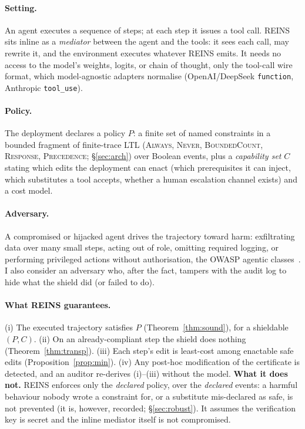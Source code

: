 \documentclass[11pt]{article}
\begin{document}
\paragraph{Setting.} An agent executes a sequence of steps; at each step it issues
a tool call. REINS sits inline as a \emph{mediator} between the agent and the
tools: it sees each call, may rewrite it, and the environment executes whatever
REINS emits. It needs no access to the model's weights, logits, or chain of
thought, only the tool-call wire format, which model-agnostic adapters normalise
(OpenAI/DeepSeek \texttt{function}, Anthropic \texttt{tool\_use}).

\paragraph{Policy.} The deployment declares a policy $P$: a finite set of named
constraints in a bounded fragment of finite-trace LTL
(\textsc{Always}, \textsc{Never}, \textsc{BoundedCount}, \textsc{Response},
\textsc{Precedence}; \S\ref{sec:arch}) over Boolean events, plus a
\emph{capability set} $C$ stating which edits the deployment can enact (which
prerequisites it can inject, which substitutes a tool accepts, whether a human
escalation channel exists) and a cost model.

\paragraph{Adversary.} A compromised or hijacked agent drives the trajectory
toward harm: exfiltrating data over many small steps, acting out of role,
omitting required logging, or performing privileged actions without
authorisation, the OWASP agentic classes~\citep{owasp2025agentic}. I also
consider an adversary who, after the fact, tampers with the audit log to hide what
the shield did (or failed to do).

\paragraph{What REINS guarantees.} (i) The executed trajectory satisfies $P$
(Theorem~\ref{thm:sound}), for a shieldable $(P,C)$. (ii) On an already-compliant
step the shield does nothing (Theorem~\ref{thm:transp}). (iii) Each step's edit is
least-cost among enactable safe edits (Proposition~\ref{prop:min}). (iv) Any
post-hoc modification of the certificate is detected, and an auditor re-derives
(i)--(iii) without the model. \textbf{What it does not.} REINS enforces only the
\emph{declared} policy, over the \emph{declared} events: a harmful behaviour
nobody wrote a constraint for, or a substitute mis-declared as safe, is not
prevented (it is, however, recorded; \S\ref{sec:robust}). It assumes the
verification key is secret and the inline mediator itself is not compromised.
\end{document}
